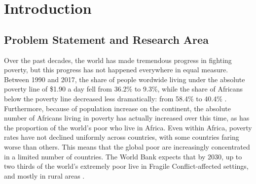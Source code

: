 \pagestyle{fancy}
\chapter{Introduction}
\label{chap:introduction}



\section{Problem Statement and Research Area}




Over the past decades, the world has made tremendous progress in fighting poverty, but this progress has not happened everywhere in equal measure. Between 1990 and 2017, the share of people wordwide living under the absolute poverty line of \$1.90 a day fell from 36.2\% to 9.3\%, while the share of Africans below the poverty line decreased less dramatically: from 58.4\% to 40.4\% \citep{WorldBank2021}. Furthermore, because of population increase on the continent, the absolute number of Africans living in poverty has actually increased over this time, as has the proportion of the world's poor who live in Africa. Even within Africa, poverty rates have not declined uniformly across countries, with some countries faring worse than others. This means that the global poor are increasingly concentrated in a limited number of countries. The World Bank expects that by 2030, up to two thirds of the world's extremely poor live in Fragile Conflict-affected settings, and mostly in rural areas \citep{WorldBank2019}. %

